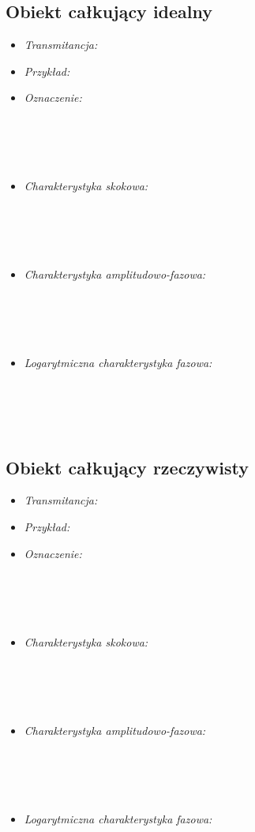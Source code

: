 \documentclass[a4paper]{article}
\begin{document}
\subsection{Obiekt całkujący idealny}
\begin{itemize}
\item \emph{Transmitancja: }
\item \emph{Przykład: }
\item \emph {Oznaczenie: } \\\\\\\\\\
\item \emph{Charakterystyka skokowa: } \\\\\\\\\\
\item \emph{Charakterystyka amplitudowo-fazowa: } \\\\\\\\\\
\item \emph{Logarytmiczna charakterystyka fazowa: } \\\\\\\\\\
\end{itemize}
\subsection{Obiekt całkujący rzeczywisty}
\begin{itemize}
\item \emph{Transmitancja: }
\item \emph{Przykład: }
\item \emph {Oznaczenie: } \\\\\\\\\\
\item \emph{Charakterystyka skokowa: } \\\\\\\\\\
\item \emph{Charakterystyka amplitudowo-fazowa: } \\\\\\\\\\
\item \emph{Logarytmiczna charakterystyka fazowa: } \\\\\\\\\\
\end{itemize}
\end{document}
